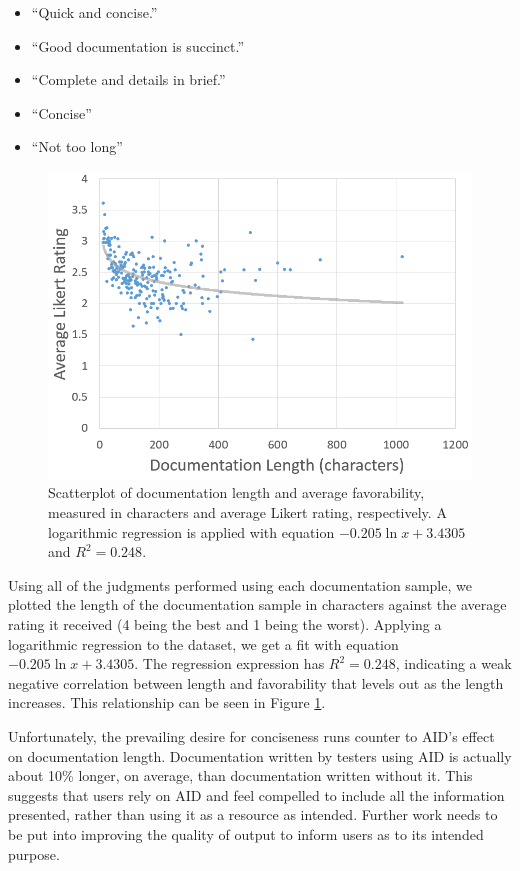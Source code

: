 \documentclass[preprint]{sigplanconf}
\begin{document}
\begin{itemize}
\item ``Quick and concise.''
\item ``Good documentation is succinct.''
\item ``Complete and details in brief.''
\item ``Concise''
\item ``Not too long''
\end{itemize}

\begin{figure}
	\begin{center}
		\includegraphics[width=\columnwidth]{length-vs-favorability.png}
	\end{center}
	\caption{Scatterplot of documentation length and average favorability, measured in characters and average Likert rating, respectively. A logarithmic regression is applied with equation \(-0.205\ln{x} + 3.4305\) and \(R^2 = 0.248\).}
	\label{figure-length-favorability}
\end{figure}

Using all of the judgments performed using each documentation sample, we plotted the length of the documentation sample in characters against the average rating it received (4 being the best and 1 being the worst). Applying a logarithmic regression to the dataset, we get a fit with equation \(-0.205\ln{x} + 3.4305\). The regression expression has \(R^2 = 0.248\), indicating a weak negative correlation between length and favorability that levels out as the length increases. This relationship can be seen in Figure \ref{figure-length-favorability}.

Unfortunately, the prevailing desire for conciseness runs counter to AID's effect on documentation length. Documentation written by testers using AID is actually about 10\% longer, on average, than documentation written without it. This suggests that users rely on AID and feel compelled to include all the information presented, rather than using it as a resource as intended. Further work needs to be put into improving the quality of output to inform users as to its intended purpose.
\end{document}
